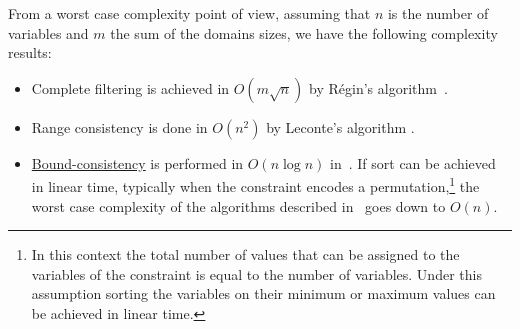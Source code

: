 \begin{ctrdesc}
From a worst case complexity point of view, assuming that $n$ is the number of variables and $m$
the sum of the domains sizes, we have the following complexity results:
\begin{itemize}
\item
Complete filtering is achieved in $O(m\sqrt{n})$ by R\'egin's algorithm~\cite{Regin94}.
\item
Range consistency  is done in $O(n^2)$ by Leconte's algorithm \cite{Leconte96}.
\item
\hyperlink{bound-consistency}{Bound-consistency} is performed in $O(n \log n)$
in~\cite{Puget98,MehlhornThiel00,LopezOrtizQuimperTrompBeek03}. If sort can be achieved
in linear time, typically when the  constraint encodes a permutation,\footnote{In this context the total number
of values that can be assigned to the variables of the  constraint is equal to the number of variables.
Under this assumption sorting the variables on their minimum or maximum values can be achieved in linear time.}
the worst case complexity of the algorithms described in~\cite{MehlhornThiel00,LopezOrtizQuimperTrompBeek03} goes down to $O(n)$.
\end{itemize}


\end{ctrdesc}
